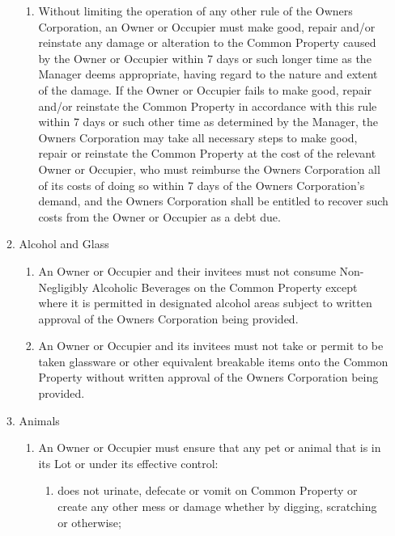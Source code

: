 \documentclass{article}
\begin{document}
\begin{enumerate}[label=\arabic*.]
\begin{enumerate}[label=\arabic{enumi}.\arabic*.]
\begin{enumerate}[label=(\arabic*)]
\item  Without limiting the operation of any other rule of the Owners Corporation, an Owner or Occupier must make good, repair and/or reinstate any damage or alteration to the Common Property caused by the Owner or Occupier within 7 days or such longer time as the Manager deems appropriate, having regard to the nature and extent of the damage. If the Owner or Occupier fails to make good, repair and/or reinstate the Common Property in accordance with this rule within 7 days or such other time as determined by the Manager, the Owners Corporation may take all necessary steps to make good, repair or reinstate the Common Property at the cost of the relevant Owner or Occupier, who must reimburse the Owners Corporation all of its costs of doing so within 7 days of the Owners Corporation’s demand, and the Owners Corporation shall be entitled to recover such costs from the Owner or Occupier as a debt due.

\end{enumerate}

\item  Alcohol and Glass

\begin{enumerate}[label=(\arabic*)]

\item  An Owner or Occupier and their invitees must not consume Non-Negligibly Alcoholic Beverages on the Common Property except where it is permitted in designated alcohol areas subject to written approval of the Owners Corporation being provided.

\item  An Owner or Occupier and its invitees must not take or permit to be taken glassware or other equivalent breakable items onto the Common Property without written approval of the Owners Corporation being provided.

\end{enumerate}

\item  Animals

\begin{enumerate}[label=(\arabic*)]

\item  An Owner or Occupier must ensure that any pet or animal that is in its Lot or under its effective control:

\begin{enumerate}[label=(\alph*)]

\item  does not urinate, defecate or vomit on Common Property or create any other mess or damage whether by digging, scratching or otherwise;


\end{enumerate}
\end{enumerate}
\end{enumerate}
\end{enumerate}
\end{document}
